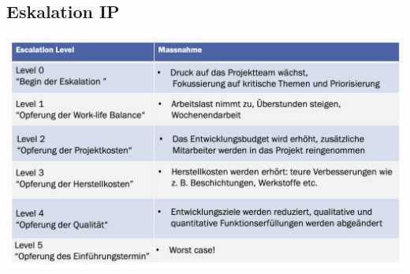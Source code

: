 \subsection{Eskalation \hfill IP}
    \begin{footnotesize}
        \includegraphics[width = 0.75\linewidth]{src/images/MAEIP_Eskalation}
    \end{footnotesize}